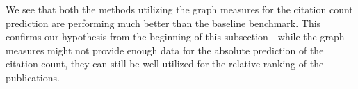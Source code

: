 We see that both the methods utilizing the graph measures for the citation count prediction are performing much better than the baseline benchmark.
This confirms our hypothesis from the beginning of this subsection - while the graph measures might not provide enough data for the absolute prediction of the citation count, 
they can still be well utilized for the relative ranking of the publications.